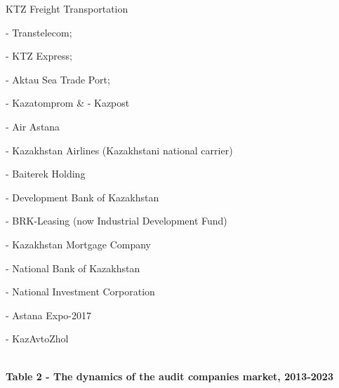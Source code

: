 \begin{longtable}[]
KTZ Freight Transportation

- Transtelecom;

- KTZ Express;

- Aktau Sea Trade Port;

- Kazatomprom & - Kazpost

- Air Astana

- Kazakhstan Airlines (Kazakhstani national carrier)

- Baiterek Holding

- Development Bank of Kazakhstan

- BRK-Leasing (now Industrial Development Fund)

- Kazakhstan Mortgage Company

- National Bank of Kazakhstan

- National Investment Corporation

- Astana Expo-2017

- KazAvtoZhol \\
\hline
{} \\
\hline
\end{longtable}




\textbf{Table 2 - The dynamics of the audit companies market, 2013-2023}

